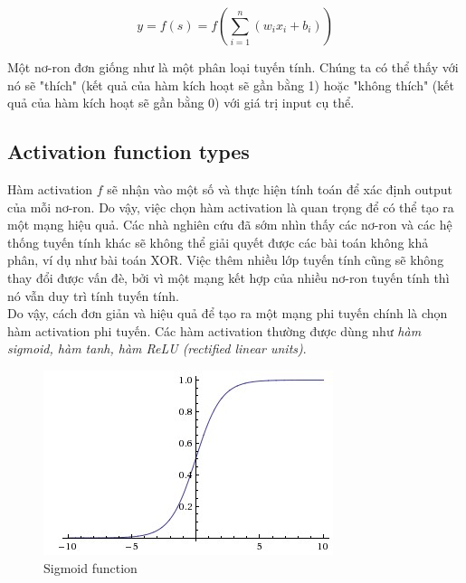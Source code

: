 \begin{center}
	\begin{equation}
		y = f(s) = f(\displaystyle \sum_{i=1}^n(w_ix_i+b_i))
	\end{equation}
\end{center}

Một nơ-ron đơn giống như là một phân loại tuyến tính. Chúng ta có thể thấy với nó sẽ "thích" (kết quả của hàm kích hoạt sẽ gần bằng 1) hoặc "không thích" (kết quả của hàm kích hoạt sẽ gần bằng 0) với giá trị input cụ thể. 

\subsection{Activation function types}

Hàm activation $f$ sẽ nhận vào một số và thực hiện tính toán để xác định output của mỗi nơ-ron. Do vậy, việc chọn hàm activation là quan trọng để có thể tạo ra một mạng hiệu quả. Các nhà nghiên cứu đã sớm nhìn thấy  các nơ-ron và các hệ thống tuyến tính khác sẽ không thể giải quyết được các bài toán không khả phân, ví dụ như bài toán XOR.  Việc thêm nhiều lớp tuyến tính cũng sẽ không thay đổi được vấn đè, bởi vì một mạng kết hợp của nhiều nơ-ron tuyến tính thì nó vẫn duy trì tính tuyến tính. \\

Do vậy, cách đơn giản và hiệu quả để tạo ra một mạng phi tuyến chính là chọn hàm activation phi tuyến. Các hàm activation thường được dùng như  \textit{hàm sigmoid, hàm tanh, hàm ReLU (rectified linear units)}.\\

\begin{center}
   \begin{figure}[htp]
   \begin{center}
     \includegraphics[scale=.5]{image/sigmoid}
    \end{center}
    \caption{Sigmoid function}
    \label{fig:sigmoid}
    \end{figure}
\end{center}

